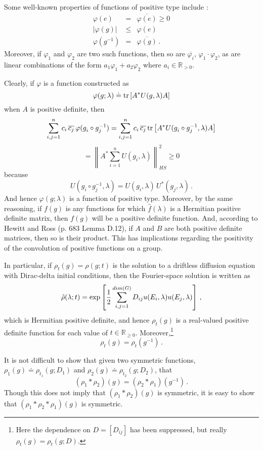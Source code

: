\documentclass{svmult}
\def\half{ {1\over 2} }
\newcommand{\IR}{\mathbb{R}}
\begin{document}
Some well-known properties of functions of positive type include \cite{8folland,8gross,8hewitt}: %
\begin{eqnarray*}
\varphi(e) &=& \overline{\varphi(e)} \geq 0 \\
|\varphi(g)| &\leq& \varphi(e) \\
\varphi(g^{-1}) &=& \overline{\varphi(g)}\,.
\end{eqnarray*}
Moreover, if $\varphi_1$ and $\varphi_2$ are two such functions, then so are
$\overline{\varphi_i}$, $\varphi_1 \cdot \varphi_2$, as are linear combinations of the form $a_1 \varphi_1 + a_2 \varphi_2$ where $a_i \in \IR_{>0}$.

Clearly, if $\varphi$ is a function constructed as
$$ \varphi(g;\lambda) \doteq {\rm tr}\left[A^* U(g,\lambda) A\right] $$
when $A$ is positive definite, then
$$ \sum_{i,j=1}^{n} c_i\, \overline{c_j}\, \varphi(g_{i}^{} \circ g_{j}^{-1})
= \sum_{i,j=1}^{n} c_i\, \overline{c_j}\, {\rm tr}\left[A^* U(g_{i}^{} \circ g_{j}^{-1},\lambda) A\right] $$
$$ = \left\|A^* \sum_{i=1}^{n} U(g_{i}^{},\lambda) \right\|_{HS}^{2} \geq 0 $$
because
$$ U(g_{i}^{} \circ g_{j}^{-1},\lambda) =
U(g_{i}^{},\lambda)\, U^*( g_{j},\lambda)\,. $$
And hence $\varphi(g;\lambda)$ is a function of positive type.
Moreover, by the same reasoning, if $f(g)$ is any functions for which $\hat{f}(\lambda)$ is a Hermitian positive definite matrix, then $f(g)$
will be a positive definite function. And, according to Hewitt and Ross
\cite{8gross,8hewitt} (p. 683 Lemma D.12),
if $A$ and $B$ are both positive definite matrices, then so is their product.
This has implications regarding the positivity of the convolution of positive
functions on a group.

In particular, if $\rho_t(g) = \rho(g;t)$ is the solution to a driftless diffusion equation with Dirac-delta initial conditions, then the Fourier-space solution is
written as
$$ \hat{\rho}(\lambda;t) = \exp\left[\half \sum_{i,j=1}^{dim(G)}
D_{ij} u(E_i,\lambda) u(E_j,\lambda) \right]\,, $$
which is Hermitian positive definite, and hence $\rho_{t}(g)$ is a real-valued
positive definite function for each value of $t \in \IR_{\geq 0}$. Moreover,\footnote{Here the dependence on $D = [D_{ij}]$ has been suppressed, but really
$\rho_{t}(g) = \rho_{t}(g;D)$.}
$$ \rho_{t}(g) = \rho_{t}(g^{-1})\,. $$

It is not difficult to show that given two symmetric functions, $\rho_1(g) \doteq \rho_{t_1}(g;D_1)$ and
$\rho_2(g) \doteq \rho_{t_2}(g;D_2)$, that
$$ (\rho_{1} * \rho_{2})(g) = (\rho_{2} * \rho_{1})(g^{-1})\,. $$
Though this does not imply that $(\rho_1 * \rho_2)(g)$ is symmetric, it is easy to show that $(\rho_1 * \rho_2 * \rho_1)(g)$ is symmetric.
\end{document}
